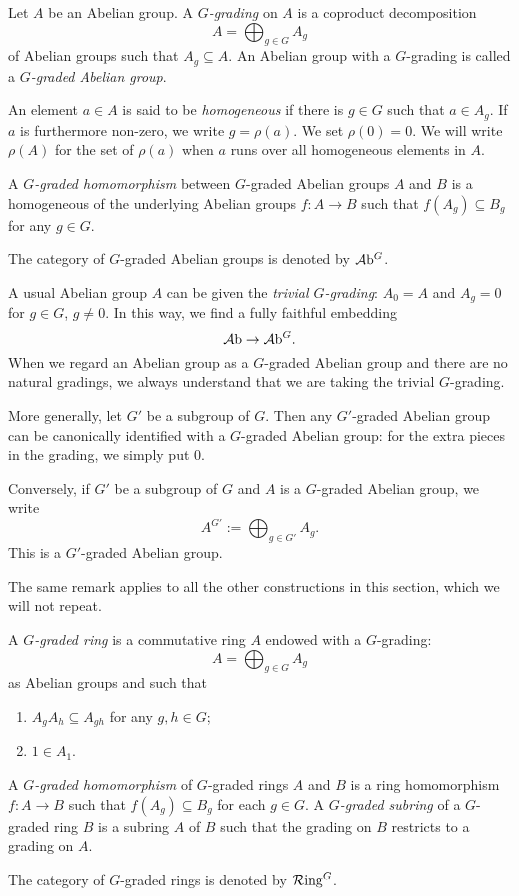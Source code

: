 \begin{definition}
    Let $A$ be an Abelian group. A \emph{$G$-grading} on $A$ is a coproduct decomposition
    \[
        A=\bigoplus_{g\in G}A_g  
    \]
    of Abelian groups such that $A_g\subseteq A$. An Abelian group with a $G$-grading is called a \emph{$G$-graded Abelian group}. 

    An element $a\in A$ is said to be \emph{homogeneous} if there is $g\in G$ such that $a\in A_g$. If $a$ is furthermore non-zero, we write $g=\rho(a)$. We set $\rho(0)=0$. We will write $\rho(A)$ for the set of $\rho(a)$ when $a$ runs over all homogeneous elements in $A$.

    A \emph{$G$-graded homomorphism} between $G$-graded Abelian groups $A$ and $B$ is a homogeneous of the underlying Abelian groups $f:A\rightarrow B$ such that $f(A_g)\subseteq B_g$ for any $g\in G$.

    The category of $G$-graded Abelian groups is denoted by $\mathcal{A}\mathrm{b}^G$.
\end{definition}
\begin{remark}
    A usual Abelian group $A$ can be given the \emph{trivial $G$-grading}: $A_0=A$ and $A_g=0$ for $g\in G$, $g\neq 0$. In this way, we find a fully faithful embedding 
    \[
        \mathcal{A}\mathrm{b}\rightarrow \mathcal{A}\mathrm{b}^G.  
    \]
    When we regard an Abelian group as a $G$-graded Abelian group and there are no natural gradings, we always understand that we are taking the trivial $G$-grading.
    
    More generally, let $G'$ be a subgroup of $G$. Then any $G'$-graded Abelian group can be canonically identified with a $G$-graded Abelian group: for the extra pieces in the grading, we simply put $0$.

    Conversely, if $G'$ be a subgroup of $G$ and $A$ is a $G$-graded Abelian group, we write
    \[
        A^{G'}:=\bigoplus_{g\in G'}A_g.  
    \]
    This is a $G'$-graded Abelian group. 

    The same remark applies to all the other constructions in this section, which we will not repeat.
\end{remark}




\begin{definition}
    A \emph{$G$-graded ring} is a commutative ring $A$ endowed with a $G$-grading:
    \[
        A=\bigoplus_{g\in G} A_g  
    \]
    as Abelian groups and such that 
    \begin{enumerate}
        \item $A_{g}A_{h}\subseteq A_{gh}$ for any $g,h\in G$;
        \item $1\in A_1$.
    \end{enumerate}

    

    A \emph{$G$-graded homomorphism} of $G$-graded rings $A$ and $B$ is a ring homomorphism $f:A\rightarrow B$ such that $f(A_g)\subseteq B_g$ for each $g\in G$. A \emph{$G$-graded subring}  of a $G$-graded ring $B$ is a subring $A$ of $B$ such that the grading on $B$ restricts to a grading on $A$.

    The category of $G$-graded rings is denoted by $\mathcal{R}\mathrm{ing}^G$.
\end{definition}

